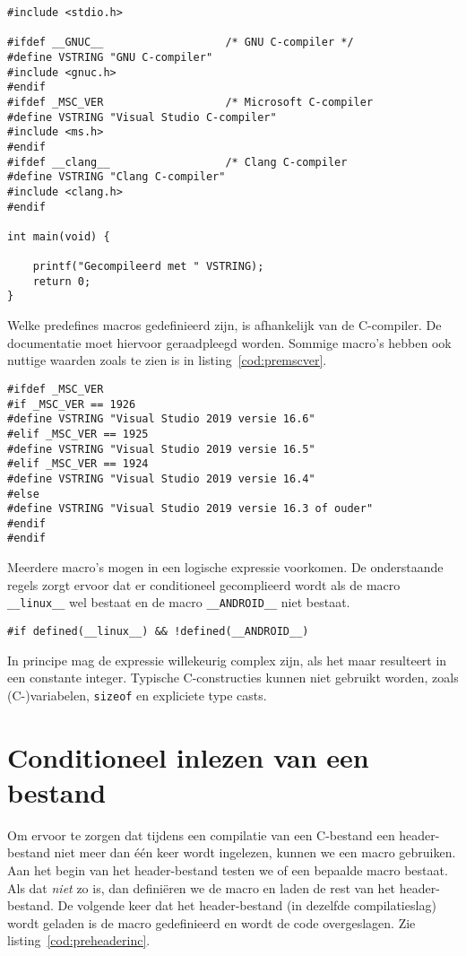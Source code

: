 \begin{lstlisting}[caption=Conditioneel inlezen van header-bestanden.,label=cod:precondinc]
#include <stdio.h>

#ifdef __GNUC__                   /* GNU C-compiler */
#define VSTRING "GNU C-compiler"
#include <gnuc.h>
#endif
#ifdef _MSC_VER                   /* Microsoft C-compiler
#define VSTRING "Visual Studio C-compiler"
#include <ms.h>
#endif
#ifdef __clang__                  /* Clang C-compiler
#define VSTRING "Clang C-compiler"
#include <clang.h>
#endif

int main(void) {

	printf("Gecompileerd met " VSTRING);
	return 0;
}

\end{lstlisting}

Welke predefines macros gedefinieerd zijn, is afhankelijk van de C-compiler. De documentatie moet hiervoor geraadpleegd worden. Sommige macro's hebben ook nuttige waarden zoals te zien is in listing~\ref{cod:premscver}.

\begin{lstlisting}[caption=Gebruik van de \texttt{\_MSC\_VER}-macro.,label=cod:premscver]
#ifdef _MSC_VER
#if _MSC_VER == 1926
#define VSTRING "Visual Studio 2019 versie 16.6"
#elif _MSC_VER == 1925
#define VSTRING "Visual Studio 2019 versie 16.5"
#elif _MSC_VER == 1924
#define VSTRING "Visual Studio 2019 versie 16.4"
#else
#define VSTRING "Visual Studio 2019 versie 16.3 of ouder"
#endif
#endif
\end{lstlisting}

Meerdere macro's mogen in een logische expressie voorkomen. De onderstaande regels zorgt ervoor dat er conditioneel gecomplieerd wordt als de macro \texttt{\_\_linux\_\_} wel bestaat en de macro \texttt{\_\_ANDROID\_\_} niet bestaat.

\hspace*{1em}\texttt{\#if defined(\_\_linux\_\_) \&\& !defined(\_\_ANDROID\_\_)}

In principe mag de expressie willekeurig complex zijn, als het maar resulteert in een constante integer. Typische C-constructies kunnen niet gebruikt worden, zoals (C-)variabelen, \texttt{sizeof} en expliciete type casts.


\section{Conditioneel inlezen van een bestand}
\label{sec:conditioneelinlezen}
Om ervoor te zorgen dat tijdens een compilatie van een C-bestand een header-bestand niet meer dan één keer wordt ingelezen, kunnen we een macro gebruiken. Aan het begin van het header-bestand testen we of een bepaalde macro bestaat. Als dat \textsl{niet} zo is, dan definiëren we de macro en laden de rest van het header-bestand. De volgende keer dat het header-bestand (in dezelfde compilatieslag) wordt geladen is de macro gedefinieerd en wordt de code overgeslagen. Zie listing~\ref{cod:preheaderinc}.

